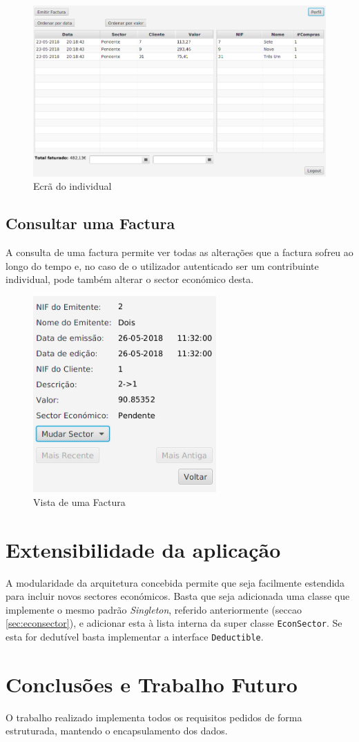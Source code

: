\documentclass[12pt,a4paper]{report}
\begin{document}
\begin{figure}[h]
    \centering
    \includegraphics[width=\textwidth]{./images/empresaScreen.png}
    \caption{Ecrã do individual}
    \label{fig:individual}
\end{figure}

    \section{Consultar uma Factura}
    \label{sec:viewFactura}
    A consulta de uma factura permite ver todas as alterações que a factura
    sofreu ao longo do tempo e, no caso de o utilizador autenticado ser
    um contribuinte individual, pode também alterar o sector económico desta.
\begin{figure}[h]
    \centering
    \includegraphics[width=7cm]{./images/facturaView.png}
    \caption{Vista de uma Factura}
    \label{fig:viewFactura}
\end{figure}

\chapter{Extensibilidade da aplicação}
    A modularidade da arquitetura concebida permite que seja facilmente
    estendida para incluir novos sectores económicos. Basta que seja
    adicionada uma classe que implemente o mesmo padrão \textit{Singleton},
    referido anteriormente (seccao \ref{sec:econsector}), e adicionar esta à lista
    interna da super classe \texttt{EconSector}. Se esta for dedutível
    basta implementar a interface \texttt{Deductible}.

\chapter{Conclusões e Trabalho Futuro}
    O trabalho realizado implementa todos os requisitos
    pedidos de forma estruturada, mantendo o encapsulamento dos dados.
\end{document}
